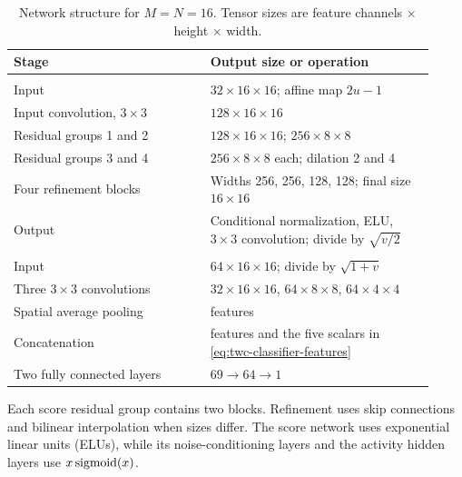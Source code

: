 \begin{table}[t]
\centering
\caption{Network structure for $M=N=16$. Tensor sizes are feature
channels $\times$ height $\times$ width.}
\label{tab:twc-networks}
\footnotesize
\setlength{\tabcolsep}{3pt}
\begin{tabular}{>{\raggedright\arraybackslash}p{0.43\linewidth}
                >{\raggedright\arraybackslash}p{0.49\linewidth}}
\toprule
Stage & Output size or operation\\
\midrule
\multicolumn{2}{l}{\textit{Score network}}\\
Input & $32\times16\times16$; affine map $2u-1$\\
Input convolution, $3\times3$ & $128\times16\times16$\\
Residual groups 1 and 2 & $128\times16\times16$; $256\times8\times8$\\
Residual groups 3 and 4 & $256\times8\times8$ each; dilation 2 and 4\\
Four refinement blocks & Widths 256, 256, 128, 128; final size $16\times16$\\
Output & Conditional normalization, ELU, $3\times3$ convolution; divide by $\sqrt{v/2}$\\
\midrule
\multicolumn{2}{l}{\textit{Activity classifier}}\\
Input & $64\times16\times16$; divide by $\sqrt{1+v}$\\
Three $3\times3$ convolutions & $32\times16\times16$, $64\times8\times8$, $64\times4\times4$\\
Spatial average pooling & 64 features\\
Concatenation & 64 features and the five scalars in \eqref{eq:twc-classifier-features}\\
Two fully connected layers & $69\rightarrow64\rightarrow1$\\
\bottomrule
\end{tabular}
\par\smallskip
\begin{minipage}{0.95\linewidth}
\footnotesize
Each score residual group contains two blocks. Refinement uses
skip connections and bilinear interpolation when sizes differ.
The score network uses exponential linear units (ELUs), while its
noise-conditioning layers and the activity hidden layers use
$x\operatorname{sigmoid}(x)$.
\end{minipage}
\end{table}
